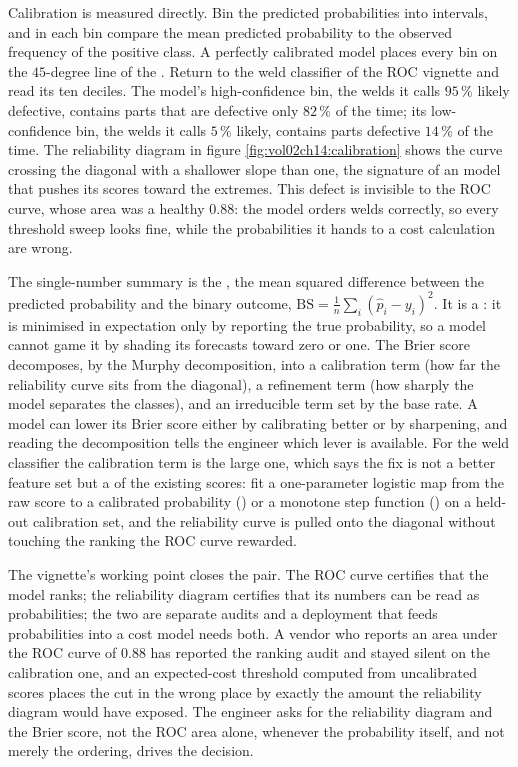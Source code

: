 Calibration is measured directly. Bin the predicted probabilities into
intervals, and in each bin compare the mean predicted probability to
the observed frequency of the positive class. A perfectly calibrated
model places every bin on the $45$-degree line of the
. Return to the weld classifier of the ROC
vignette and read its ten deciles. The model's high-confidence bin, the
welds it calls $95\,\%$ likely defective, contains parts that are
defective only $82\,\%$ of the time; its low-confidence bin, the welds
it calls $5\,\%$ likely, contains parts defective $14\,\%$ of the time.
The reliability diagram in figure \ref{fig:vol02ch14:calibration} shows
the curve crossing the diagonal with a shallower slope than one, the
signature of an  model that pushes its scores
toward the extremes. This defect is invisible to the ROC curve, whose
area was a healthy $0.88$: the model orders welds correctly, so every
threshold sweep looks fine, while the probabilities it hands to a
cost calculation are wrong.

The single-number summary is the , the mean
squared difference between the predicted probability and the binary
outcome, $\mathrm{BS} = \frac{1}{n}\sum_{i}(\hat{p}_{i} - y_{i})^{2}$.
It is a : it is minimised in expectation
only by reporting the true probability, so a model cannot game it by
shading its forecasts toward zero or one. The Brier score decomposes,
by the Murphy decomposition, into a calibration term (how far the
reliability curve sits from the diagonal), a refinement term (how
sharply the model separates the classes), and an irreducible term set
by the base rate. A model can lower its Brier score either by
calibrating better or by sharpening, and reading the decomposition
tells the engineer which lever is available. For the weld classifier
the calibration term is the large one, which says the fix is not a
better feature set but a  of the existing
scores: fit a one-parameter logistic map from the raw score to a
calibrated probability () or a monotone
step function () on a held-out
calibration set, and the reliability curve is pulled onto the diagonal
without touching the ranking the ROC curve rewarded.

The vignette's working point closes the pair. The ROC curve certifies
that the model ranks; the reliability diagram certifies that its
numbers can be read as probabilities; the two are separate audits and a
deployment that feeds probabilities into a cost model needs both. A
vendor who reports an area under the ROC curve of $0.88$ has reported
the ranking audit and stayed silent on the calibration one, and an
expected-cost threshold computed from uncalibrated scores places the
cut in the wrong place by exactly the amount the reliability diagram
would have exposed. The engineer asks for the reliability diagram and
the Brier score, not the ROC area alone, whenever the probability
itself, and not merely the ordering, drives the decision.

